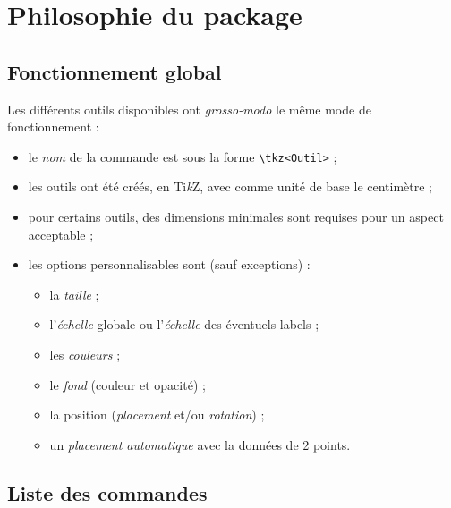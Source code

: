 \documentclass[french,a4paper,11pt]{article}
\providecommand\tikzlogo{Ti\textit{k}Z}
\let\TikZ\tikzlogo
\begin{document}
\pagebreak

\section{Philosophie du package}

\subsection{Fonctionnement global}

\begin{tipblock}
Les différents outils disponibles ont \textit{grosso-modo} le même mode de fonctionnement :

\begin{itemize}
	\item le \textit{nom} de la commande est sous la forme \texttt{\textbackslash tkz<Outil>} ;
	\item les outils ont été créés, en \TikZ, avec comme unité de base le centimètre ;
	\item pour certains outils, des dimensions minimales sont requises pour un aspect acceptable ;
	\item les options personnalisables sont (sauf exceptions) :
	\begin{itemize}
		\item la \textit{taille} ;
		\item l'\textit{échelle} globale ou l'\textit{échelle} des éventuels labels ;
		\item les \textit{couleurs} ;
		\item le \textit{fond} (couleur et opacité) ;
		\item la position (\textit{placement} et/ou \textit{rotation}) ;
		\item un \textit{placement automatique} avec la données de 2 points.
	\end{itemize}
\end{itemize}
\vspace*{-\baselineskip}\leavevmode
\end{tipblock}

\subsection{Liste des commandes}
\end{document}
